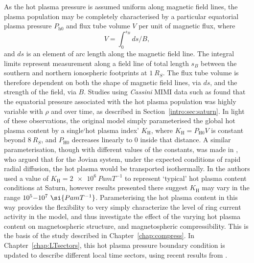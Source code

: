 {As the hot plasma pressure is assumed uniform along magnetic field lines, the plasma population may be completely characterised by a particular equatorial plasma pressure $P_\mathrm{h0}$ and flux tube volume $V$ per unit of magnetic flux, where
\begin{equation}\label{intro:eq:ftv}
V = \int_{0}^{s_{B}} ds/B,
\end{equation}
and $ds$ is an element of arc length along the magnetic field line. The integral limits represent measurement along a field line of total length $s_B$ between the southern and northern ionospheric footprints at $\SI{1}{R_S}$. The flux tube volume is therefore dependent on both the shape of magnetic field lines, via $ds$, and the strength of the field, via $B$. Studies using \textit{Cassini} MIMI data such as \citet{sergis2007} found that the equatorial pressure associated with the hot plasma population was highly variable with $\rho$ and over time, as described in Section~\ref{intro:sec:saturn}. In light of these observations, the original \citet{achilleos2010a} model simply parameterised the global hot plasma content by a single`hot plasma index' $K_\mathrm{H}$, where $  K_\mathrm{H}= P_\mathrm{H0}V$ is constant beyond $\SI{8}{R_S}$, and $P_\mathrm{H0}$ decreases linearly to 0 inside that distance. A similar parameterisation, though with different values of the constants, was made in \citet{caudal1986}, who argued that for the Jovian system, under the expected conditions of rapid radial diffusion, the hot plasma would be transported isothermally. In \citet{achilleos2010a} the authors used a value of $K_\mathrm{H} = \SI{2e6}{Pa m T^{-1}}$ to represent `typical' hot plasma content conditions at Saturn, however results presented there suggest $K_\mathrm{H}$ may vary in the range $10^5{\--}10^7~\si{Pa m T^{-1}}$. Parameterising the hot plasma content in this way provides the flexibility to very simply characterize the level of ring current activity in the model, and thus investigate the effect of the varying hot plasma content on magnetospheric structure, and magnetospheric compressibility. This is the basis of the study described in Chapter~\ref{chap:compress}. In Chapter~\ref{chap:LTsectors}, this hot plasma pressure boundary condition is updated to describe different local time sectors, using recent results from \citet{sergis2017}.

}
